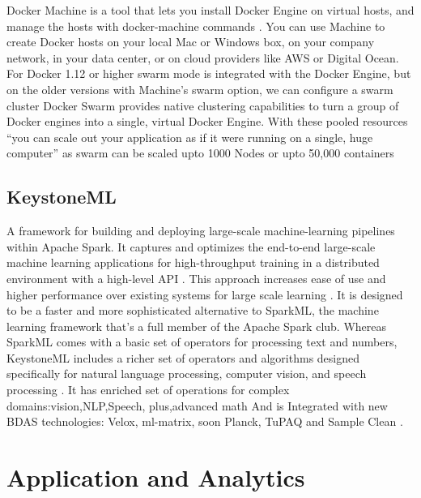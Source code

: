     Docker Machine is a tool that lets you install Docker Engine on
    virtual hosts, and manage the hosts with docker-machine commands
    \cite{docker-book}. You can use Machine to create Docker hosts on
    your local Mac or Windows box, on your company network, in your
    data center, or on cloud providers like AWS or Digital Ocean. For
    Docker 1.12 or higher swarm mode is integrated with the Docker
    Engine, but on the older versions with Machine's swarm option, we
    can configure a swarm cluster Docker Swarm provides native
    clustering capabilities to turn a group of Docker engines into a
    single, virtual Docker Engine. With these pooled resources ``you
    can scale out your application as if it were running on a single,
    huge computer'' \cite{www-docker} as swarm can be scaled upto 1000
    Nodes or upto 50,000 containers
    
\subsection{KeystoneML}
    
    A framework for building and deploying large-scale
    machine-learning pipelines within Apache Spark. It captures and
    optimizes the end-to-end large-scale machine learning applications
    for high-throughput training in a distributed environment with a
    high-level API \cite{sparks2016keystoneml}. This approach
    increases ease of use and higher performance over existing systems
    for large scale learning \cite{sparks2016keystoneml}. It is
    designed to be a faster and more sophisticated alternative to
    SparkML, the machine learning framework that’s a full member of
    the Apache Spark club. Whereas SparkML comes with a basic set of
    operators for processing text and numbers, KeystoneML includes a
    richer set of operators and algorithms designed specifically for
    natural language processing, computer vision, and speech
    processing \cite{building}. It has enriched set of operations for
    complex domains:vision,NLP,Speech, plus,advanced math And is
    Integrated with new BDAS technologies: Velox, ml-matrix, soon
    Planck, TuPAQ and Sample Clean \cite{spark}.

\section{Application and Analytics}

